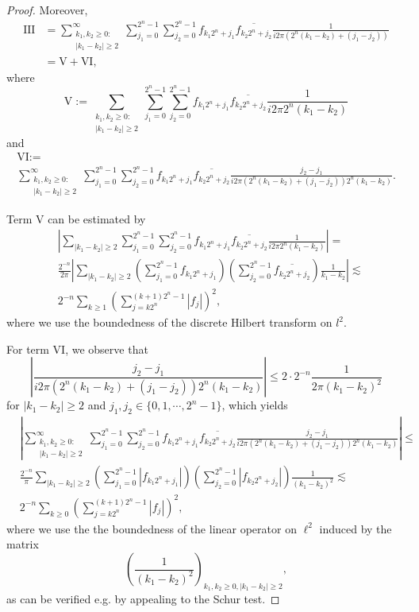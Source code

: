 \documentclass[10pt,a4paper]{amsart}
\begin{document}
\begin{proof}
Moreover,
\begin{align*}
\text{III} &= \sum_{\substack{k_1, k_2\geq 0:\\ |k_1-k_2| \geq 2}}^\infty
\sum_{j_1=0}^{2^{n}-1} \sum_{j_2=0}^{2^{n}-1} f_{k_1 2^n +j_1} \overline{f_{k_2 2^n + j_2}}  \frac{1}{i 2\pi ( 2^n (k_1-k_2) + (j_1-j_2))} \\
& = \text{V} + \text{VI},
\end{align*}
where
\[
\text{V}:= \sum_{\substack{k_1, k_2\geq 0:\\ |k_1 -k_2|\geq 2}}
\sum_{j_1=0}^{2^{n}-1} \sum_{j_2=0}^{2^{n}-1} f_{k_1 2^n +j_1} \overline{f_{k_2 2^n + j_2}}  \frac{1}{i 2\pi 2^n (k_1-k_2)} 
\]
and
\begin{multline*}
\text{VI} := \\
\sum_{\substack{ k_1, k_2\geq 0:\\ |k_1-k_2| \geq 2}}^\infty
\sum_{j_1=0}^{2^{n}-1} \sum_{j_2=0}^{2^{n}-1} f_{k_1 2^n +j_1} \overline{f_{k_2 2^n + j_2}}  \frac{j_2 -j_1}{i 2\pi ( 2^n (k_1-k_2) + (j_1-j_2)) 2^n (k_1-k_2) } .
\end{multline*}

Term V can be estimated by
\begin{align*}
& \left|\sum_{|k_1 -k_2|\geq 2}
\sum_{j_1=0}^{2^{n}-1} \sum_{j_2=0}^{2^{n}-1} f_{k_1 2^n +j_1} \overline{f_{k_2 2^n + j_2}}  \frac{1}{i 2\pi 2^n (k_1-k_2)}
\right| = \\
& \frac{2^{-n}}{2 \pi} \left|\sum_{|k_1 -k_2|\geq 2}
\left(\sum_{j_1=0}^{2^{n}-1}  f_{k_1 2^n +j_1} \right)
\left( \sum_{j_2=0}^{2^{n}-1} \overline{f_{k_2 2^n + j_2}} \right) \frac{1}{k_1-k_2}
\right|
\lesssim \\
&  2^{-n} \sum_{k \geq 1} \left(\sum_{j=k 2^{n}}^{(k+1)2^{n}-1} |f_j| \right)^2,
\end{align*}
where we use the boundedness of the discrete Hilbert transform on $l^2$.

For term $\text{VI}$, we observe that
\[
\left|\frac{j_2 -j_1}{i 2\pi ( 2^n (k_1-k_2) + (j_1-j_2))  2^n (k_1-k_2)}
 \right| \leq 2 \cdot 2^{-n} \frac{1}{2\pi  (k_1-k_2)^2}
\]
for $|k_1-k_2| \geq 2$ and $j_1, j_2 \in \{ 0, 1, \cdots, 2^n-1\}$, which yields
\begin{align*}
 & \left|\sum_{\substack{ k_1, k_2\geq 0:\\ |k_1-k_2| \geq 2}}^\infty
\sum_{j_1=0}^{2^{n}-1} \sum_{j_2=0}^{2^{n}-1} f_{k_1 2^n +j_1} \overline{f_{k_2 2^n + j_2}}  \frac{j_2 -j_1}{i 2\pi ( 2^n (k_1-k_2) + (j_1-j_2)) 2^n (k_1-k_2)   } \right| \leq \\
&   \frac{2^{-n}}{ \pi} \sum_{|k_1 -k_2|\geq 2}
\left(\sum_{j_1=0}^{2^{n}-1}  |f_{k_1 2^n +j_1} |\right)
\left( \sum_{j_2=0}^{2^{n}-1} |f_{k_2 2^n + j_2}| \right) \frac{1}{(k_1-k_2)^2}
\lesssim \\
& 2^{-n} \sum_{k \geq 0} \left(\sum_{j=k 2^{n}}^{(k+1)2^{n}-1} |f_j| \right)^2,
\end{align*}
where we use the the boundedness of the linear operator on $\ell^2$ induced by the matrix
\[
\left(\frac{1}{(k_1-k_2)^2}\right)_{k_1, k_2 \geq 0, |k_1 -k_2|\geq 2},
\]
as can be verified e.g. by appealing to the Schur test.


\end{proof}
\end{document}
